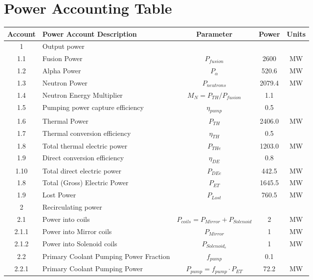 \newpage
\section{Power Accounting Table}

\begin{table}[ht!]								
\centering								
\begin{tabular}{|c|p{5cm}|c|c|c|}								
\hline								
\textbf{Account}	&	\textbf{Power Account Description}	&	\textbf{Parameter }	&	\textbf{Power}	&	\textbf{Units} \\
\hline								
1	&	Output power	&		&		&	\\
\hline
1.1	&	Fusion Power	&	$P_{{fusion}}$	&	2600	&	MW \\
1.2	&	Alpha Power	&	$P_{{\alpha}}$	&	520.6	&	MW \\
1.3	&	Neutron Power	&	$P_{{neutrons}}$	&	2079.4	&	MW \\
1.4	&	Neutron Energy Multiplier	&	$M_N = P_{{TH}}/P_{{fusion}}$	&	1.1	&	\\
1.5	&	Pumping power capture efficiency	&	$\eta_{{pump}}$	&	0.5	&	\\
1.6	&	Thermal Power	&	$P_{{TH}}$	&	2406.0	&	MW \\
1.7	&	Thermal conversion efficiency	&	$\eta_{{TH}}$	&	0.5	&	\\
1.8	& Total thermal electric power &	$P_{THe}$ &	1203.0	& MW \\
1.9	& Direct conversion efficiency &	$\eta_{DE}$ &	0.8 & \\	
1.10 &	Total direct electric power	& $P_{DEe}$	& 442.5 & MW \\ 
1.8	&	Total (Gross) Electric Power	&	$P_{{ET}}$	&	1645.5	&	MW \\
1.9	&	Lost Power	&	$P_{{Lost}}$	&	760.5	&	MW \\
\hline								
2	&	Recirculating power	&		&		&	\\
\hline
2.1	&	Power into coils 	&	$P_{{coils}} = P_{{Mirror}} + P_{{Solenoid}}$	&	2	&	MW \\
2.1.1	&	Power into Mirror coils	&	$P_{{Mirror}}$	&	1	&	MW \\
2.1.2	&	Power into Solenoid coils	&	$P_{{Solenoid}_e}$	&	1		&	MW \\
2.2	&	Primary Coolant Pumping Power Fraction	&	$f_{{pump}}$	&	0.1 &	\\
2.2.1	&	Primary Coolant Pumping Power	&	$P_{{pump}} = f_{{pump}} \cdot P_{{ET}}$	&	72.2	&	MW \\

\end{tabular}
\end{table}
